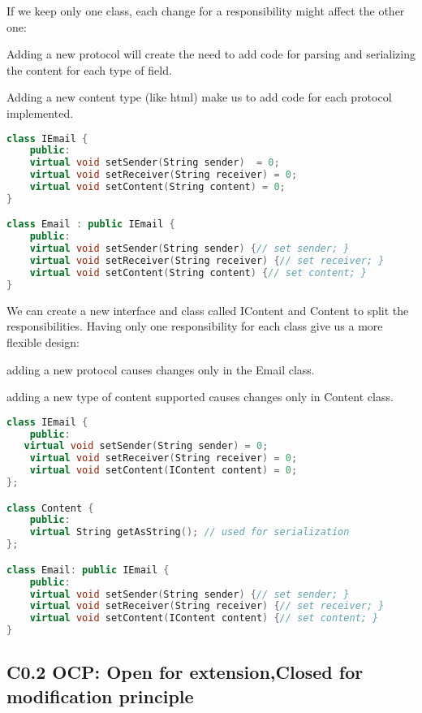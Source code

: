\documentclass{book}
\begin{document}
If we keep only one class, each change for a responsibility might affect the other one:

    Adding a new protocol will create the need to add code for parsing and serializing the content for each type of field.

    Adding a new content type (like html) make us to add code for each protocol implemented.


\begin{lstlisting}[caption={single responsibility principle - bad example}, language=C++]
class IEmail {
    public:
    virtual void setSender(String sender)  = 0;
	virtual void setReceiver(String receiver) = 0;
	virtual void setContent(String content) = 0;
}

class Email : public IEmail {
    public:
    virtual void setSender(String sender) {// set sender; }
	virtual void setReceiver(String receiver) {// set receiver; }
	virtual void setContent(String content) {// set content; }
}
\end{lstlisting}

We can create a new interface and class called IContent and Content to split the responsibilities. Having only one responsibility for each class give us a more flexible design:

    adding a new protocol causes changes only in the Email class.

    adding a new type of content supported causes changes only in Content class.
 

\begin{lstlisting}[caption={single responsibility principle - good example}, language=C++]
class IEmail {
    public:
   virtual void setSender(String sender) = 0;
	virtual void setReceiver(String receiver) = 0;
	virtual void setContent(IContent content) = 0;
};

class Content {
    public:
    virtual String getAsString(); // used for serialization
};

class Email: public IEmail {
    public:
    virtual void setSender(String sender) {// set sender; }
	virtual void setReceiver(String receiver) {// set receiver; }
	virtual void setContent(IContent content) {// set content; }
}
\end{lstlisting}
\subsection{C0.2 OCP: Open for extension,Closed for modification principle}\label{OCP}
\end{document}
